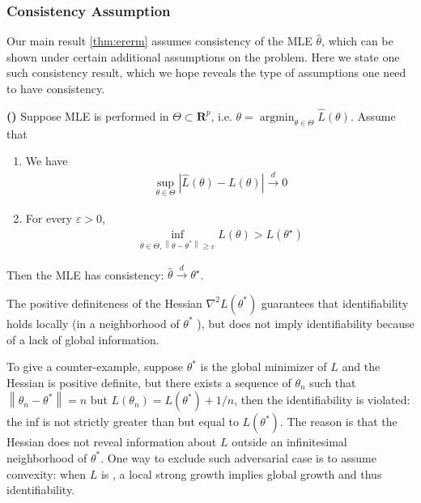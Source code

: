 \documentclass{article}
\newcommand{\bfs}[1]{\textbf{({#1}) }}
\begin{document}
\subsubsection{Consistency Assumption}\label{sssec:oieeeq}
Our main result \cref{thm:ererm} assumes consistency of the MLE $\hat{\theta}$, which can be shown under certain additional assumptions on the problem. Here we state one such consistency result, which we hope reveals the type of assumptions one need to have consistency.
\begin{thma} \bfs{\cite[Theorem 5.7]{van2000asymptotic}}
  Suppose MLE is performed in $\Theta \subset \mathbf{R}^{p}$, i.e. $\theta=\operatorname{argmin}_{\theta \in \Theta} \hat{L}(\theta)$. Assume that
\begin{enumerate}
    \item {} We have
\begin{align*}
\sup _{\theta \in \Theta}|\hat{L}(\theta)-L(\theta)| \stackrel{d}{\longrightarrow} 0
\end{align*}
\item {} For every $\varepsilon>0$,
\begin{align*}
\inf _{\theta \in \Theta,\left\|\theta-\theta^{*}\right\| \geq \varepsilon} L(\theta)>L\left(\theta^{\star}\right)
\end{align*}
\end{enumerate}
Then the MLE has consistency: $\hat{\theta} \stackrel{d}{\longrightarrow} \theta^{\star}$.
\end{thma}

\begin{rema}
The positive definiteness of the Hessian $\nabla^{2} L\left(\theta^{*}\right)$ guarantees that identifiability holds locally (in a neighborhood of $\theta^{*}$ ), but does not imply identifiability because of a lack of global information.

To give a counter-example, suppose $\theta^{*}$ is the global minimizer of $L$ and the Hessian is positive definite, but there exists a sequence of $\theta_{n}$ such that $\left\|\theta_{n}-\theta^{*}\right\|=n$ but $L\left(\theta_{n}\right)=L\left(\theta^{*}\right)+1 / n$, then the identifiability is violated: the inf is not strictly greater than but equal to $L\left(\theta^{*}\right)$. The reason is that the Hessian does not reveal information about $L$ outside an infinitesimal neighborhood of $\theta^{*}$.
One way to exclude such adversarial case is to assume convexity: when $L$ is , a local strong growth implies global growth and thus identifiability.
\end{rema} 
\end{document}
